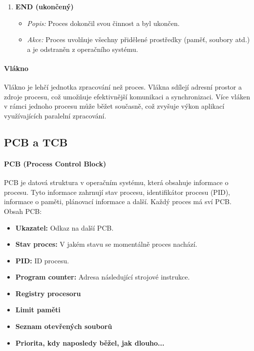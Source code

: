 \begin{enumerate}
    \item \textbf{END (ukončený)}
    \begin{itemize}
        \item \textit{Popis:} Proces dokončil svou činnost a byl ukončen.
        \item \textit{Akce:} Proces uvolňuje všechny přidělené prostředky (paměť, soubory atd.) a je odstraněn z operačního systému.
    \end{itemize}
    
\end{enumerate}


\paragraph{Vlákno}
Vlákno je lehčí jednotka zpracování než proces. Vlákna sdílejí adresní prostor a zdroje procesu, což umožňuje efektivnější komunikaci a synchronizaci. Více vláken v rámci jednoho procesu může běžet současně, což zvyšuje výkon aplikací využívajících paralelní zpracování.

\subsection{PCB a TCB}
\paragraph{PCB (Process Control Block)}
PCB je datová struktura v operačním systému, která obsahuje informace o procesu. Tyto informace zahrnují stav procesu, identifikátor procesu (PID), informace o paměti, plánovací informace a další. Každý proces má sví PCB. Obsah PCB: 
\begin{itemize}
    \item \textbf{Ukazatel:} Odkaz na další PCB.
    \item \textbf{Stav proces:} V jakém stavu se momentálně proces nachází.
    \item \textbf{PID:} ID procesu.
    \item \textbf{Program counter:} Adresa následující strojové instrukce.
    \item \textbf{Registry procesoru}
    \item \textbf{Limit paměti}
    \item \textbf{Seznam otevřených souborů}
    \item \textbf{Priorita, kdy naposledy běžel, jak dlouho...}
\end{itemize}

